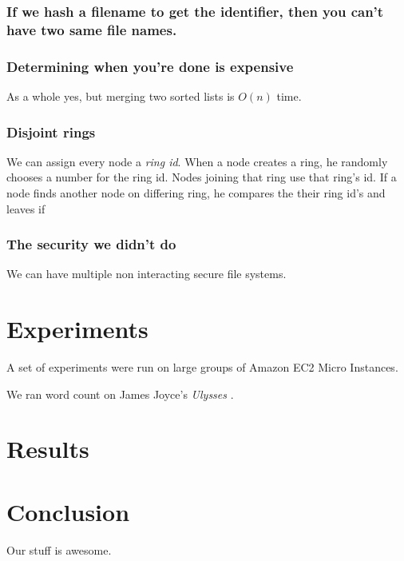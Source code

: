 \documentclass[conference, compsocconf, letterpaper]{IEEEtran}
\begin{document}
\subsubsection{If we hash a filename to get the identifier, then you can't have two same file names.}

\subsubsection{Determining when you're done is expensive}
As a whole yes, but merging two sorted lists is $O(n)$ time. 


\subsubsection{Disjoint rings}
We can assign every node a \emph{ring id}.  When a node creates a ring, he randomly chooses a number for the ring id.  Nodes joining that ring use that ring's id.  If a node finds another node on differing ring, he compares the their ring id's and leaves if  

\subsubsection{The security we didn't do}
We can have multiple non interacting secure file systems.


\section{Experiments}
A set of experiments were run on large groups of Amazon EC2 Micro Instances\cite{amazon-micro}.

We ran word count on James Joyce's \emph{Ulysses} \cite{joyce1924ulysses}.


 
\section{Results}

\section{Conclusion}
Our stuff \cite{code} is awesome.



\end{document}
